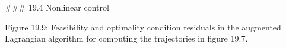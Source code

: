 

### 19.4 Nonlinear control

Figure 19.9: Feasibility and optimality condition residuals in the augmented Lagrangian algorithm for computing the trajectories in figure 19.7.

